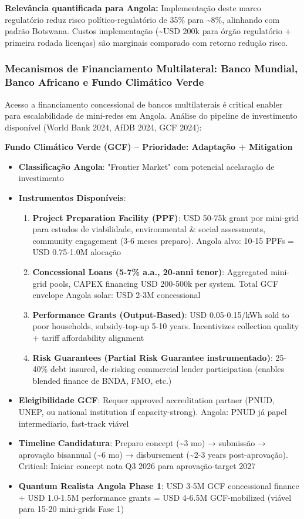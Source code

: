 \documentclass[12pt, a4paper]{article}
\begin{document}
\textbf{Relevância quantificada para Angola:} Implementação deste marco regulatório reduz risco político-regulatório de 35\% para \textasciitilde{}8\%, alinhando com padrão Botswana. Custos implementação (\textasciitilde{}USD 200k para órgão regulatório + primeira rodada licenças) são marginais comparado com retorno redução risco.

\subsubsection{Mecanismos de Financiamento Multilateral: Banco Mundial, Banco Africano e Fundo Climático Verde}

Acesso a financiamento concessional de bancos multilaterais é critical enabler para escalabilidade de mini-redes em Angola. Análise do pipeline de investimento disponível (World Bank 2024, AfDB 2024, GCF 2024):

\textbf{Fundo Climático Verde (GCF) – Prioridade: Adaptação + Mitigation}
\begin{itemize}
\item \textbf{Classificação Angola}: "Frontier Market" com potencial acelaração de investimento
\item \textbf{Instrumentos Disponíveis}:
  \begin{enumerate}
  \item \textbf{Project Preparation Facility (PPF)}: USD 50-75k grant por mini-grid para estudos de viabilidade, environmental \& social assessments, community engagement (3-6 meses preparo). Angola alvo: 10-15 PPFs = USD 0.75-1.0M alocação
  \item \textbf{Concessional Loans (5-7\% a.a., 20-anni tenor)}: Aggregated mini-grid pools, CAPEX financing USD 200-500k per system. Total GCF envelope Angola solar: USD 2-3M concessional
  \item \textbf{Performance Grants (Output-Based)}: USD 0.05-0.15/kWh sold to poor households, subsidy-top-up 5-10 years. Incentivizes collection quality + tariff affordability alignment
  \item \textbf{Risk Guarantees (Partial Risk Guarantee instrumentado)}: 25-40\% debt insured, de-risking commercial lender participation (enables blended finance de BNDA, FMO, etc.)
  \end{enumerate}
\item \textbf{Eleigibilidade GCF}: Requer approved accreditation partner (PNUD, UNEP, ou national institution if capacity-strong). Angola: PNUD já papel intermediario, fast-track viável
\item \textbf{Timeline Candidatura}: Preparo concept (\textasciitilde{}3 mo) → submissão → aprovação bisannual (\textasciitilde{}6 mo) → disbursement (\textasciitilde{}2-3 years post-aprovação). Critical: Iniciar concept nota Q3 2026 para aprovação-target 2027
\item \textbf{Quantum Realista Angola Phase 1}: USD 3-5M GCF concessional finance + USD 1.0-1.5M performance grants = USD 4-6.5M GCF-mobilized (viável para 15-20 mini-grids Fase 1)
\end{itemize}
\end{document}
